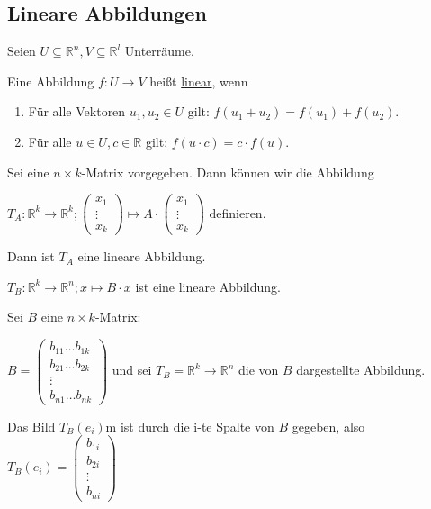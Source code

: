 \documentclass{mg2}
\begin{document}
\subsection{Lineare Abbildungen}
\begin{definition}
Seien $U \subseteq \mathbb{R}^n, V \subseteq \mathbb{R}^l$ Unterräume.

Eine Abbildung $f: U \to V$ heißt \underline{linear}, wenn
\begin{enumerate}
\item Für alle Vektoren $u_1,u_2 \in U$ gilt: $f(u_1+u_2) = f(u_1) + f(u_2)$.
\item Für alle $u \in U, c \in \mathbb{R}$ gilt: $f(u\cdot c) = c \cdot f(u)$.
\end{enumerate}
\end{definition}

\begin{satz}
Sei eine $n \times k$-Matrix vorgegeben. Dann können wir die Abbildung 

$T_A: \mathbb{R}^k \to \mathbb{R}^k; \begin{pmatrix}x_1\\\vdots\\x_k\end{pmatrix} \mapsto A \cdot \begin{pmatrix}x_1\\\vdots\\x_k\end{pmatrix}$ definieren.

Dann ist $T_A$ eine lineare Abbildung.
\end{satz}

\begin{satz}
$T_B: \mathbb{R}^k \to \mathbb{R}^n; x \mapsto B \cdot x$ ist eine lineare Abbildung.
\end{satz}

\begin{proposition}
Sei $B$ eine $n \times k$-Matrix:

$B = \begin{pmatrix} b_{11} \dots b_{1k}\\ b_{21} \dots b_{2k}\\\vdots\\ b_{n1} \dots b_{nk}\end{pmatrix}$ und sei $T_B = \mathbb{R}^k \to \mathbb{R}^n$ die von $B$ dargestellte Abbildung. 

Das Bild $T_B(e_i)$m ist durch die i-te Spalte von $B$ gegeben, also $T_B(e_i) = \begin{pmatrix}b_{1i}\\b_{2i}\\\vdots\\b_{ni}\end{pmatrix}$
\end{proposition}
\end{document}
